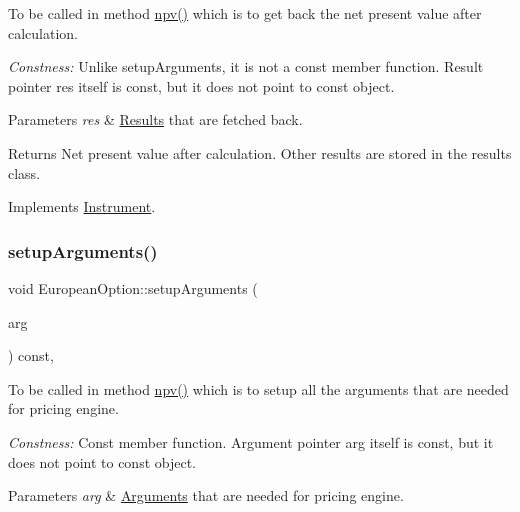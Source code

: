 To be called in method \hyperlink{class_instrument_aa750f2ae95a21d65a073da3171e8d084}{npv()} which is to get back the net present value after calculation. 

{\itshape Constness\+:} Unlike setup\+Arguments, it is not a const member function. Result pointer res itself is const, but it does not point to const object. 
\begin{DoxyParams}{Parameters}
{\em res} & \hyperlink{class_european_option_1_1_results}{Results} that are fetched back. \\
\hline
\end{DoxyParams}
\begin{DoxyReturn}{Returns}
Net present value after calculation. Other results are stored in the results class. 
\end{DoxyReturn}


Implements \hyperlink{class_instrument_a381f093402f789ad7c0ffecd233167dc}{Instrument}.

\hypertarget{class_european_option_a77e3bc17dbcf317561c4920f6bfa84de}{}\label{class_european_option_a77e3bc17dbcf317561c4920f6bfa84de} 
\subsubsection{\texorpdfstring{setup\+Arguments()}{setupArguments()}}
{\footnotesize\ttfamily void European\+Option\+::setup\+Arguments (\begin{DoxyParamCaption}\item[{\hyperlink{class_pricing_engine_1_1_arguments}{Pricing\+Engine\+::\+Arguments} $\ast$const}]{arg }\end{DoxyParamCaption}) const\hspace{0.3cm}{\ttfamily [override]}, {\ttfamily [virtual]}}



To be called in method \hyperlink{class_instrument_aa750f2ae95a21d65a073da3171e8d084}{npv()} which is to setup all the arguments that are needed for pricing engine. 

{\itshape Constness\+:} Const member function. Argument pointer arg itself is const, but it does not point to const object. 
\begin{DoxyParams}{Parameters}
{\em arg} & \hyperlink{class_european_option_1_1_arguments}{Arguments} that are needed for pricing engine. \\
\hline
\end{DoxyParams}


